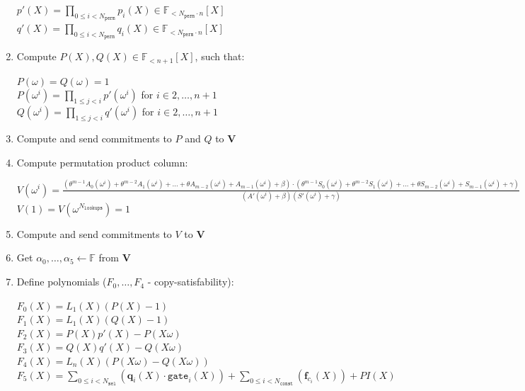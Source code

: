 \begin{enumerate}
	\begin{center}
		$p'(X) = \prod\limits_{0 \leq i < N_{\texttt{perm}}} p_i(X) \in \mathbb{F}_{<N_{\texttt{perm}} \cdot n}[X]$ \\
		$q'(X) = \prod\limits_{0 \leq i < N_{\texttt{perm}}} q_i(X) \in \mathbb{F}_{<N_{\texttt{perm}} \cdot n}[X]$
	\end{center}
	\item Compute $P(X), Q(X) \in \mathbb{F}_{<n+1}[X]$, such that:
	\begin{center}
		$P(\omega) = Q(\omega) = 1$ \\
		$P(\omega^i) = \prod\limits_{1 \leq j < i}p'(\omega^i)$ for $i \in {2, \dots, n + 1}$ \\
		$Q(\omega^i) = \prod\limits_{1 \leq j < i}q'(\omega^i)$ for $i \in {2, \dots, n + 1}$ \\
	\end{center}
	\item Compute and send commitments to $P$ and $Q$ to \textbf{V}
	\item Compute permutation product column:
	\begin{center}
	$V (\omega^i) = \frac{(\theta^{m-1} A_0(\omega^i) + \theta^{m-2} A_1(\omega^i) + ... + \theta A_{m-2}(\omega^i) + A_{m-1}(\omega^i) + \beta) \cdot (\theta^{m-1} S_0(\omega^i) + \theta^{m-2} S_1(\omega^i) + ... + \theta S_{m-2}(\omega^i) + S_{m-1}(\omega^i) + \gamma)} {(A'(\omega^i) + \beta) (S'(\omega^i) + \gamma)}$ \\
	$V (1) = V (\omega^{N_{\texttt{lookups}}}) = 1$
	\end{center}
	\item Compute and send commitments to $V$ to \textbf{V}
	\item Get $\alpha_0, \dots, \alpha_5 \leftarrow \mathbb{F}$ from \textbf{V}
	\item Define polynomials ($F_0, \dots, F_4$ - copy-satisfability):
	\begin{center}
		$F_0(X) = L_1(X)(P(X) - 1)$\\
		$F_1(X) = L_1(X)(Q(X) - 1)$ \\
		$F_2(X) = P(X)p'(X) - P(X\omega)$ \\
		$F_3(X) = Q(X)q'(X) - Q(X\omega)$ \\
		$F_4(X) = L_n(X)(P(X\omega) - Q(X\omega))$ \\
		$F_5(X) = \sum\limits_{0 \leq i < N_{\texttt{sel}}} (\textbf{q}_{i}(X) \cdot \texttt{gate}_i(X))
			+ \sum\limits_{0 \leq i < N_{\texttt{const}}}(\textbf{f}_{c_i}(X)) + PI(X)$
	\end{center}

\end{enumerate}
